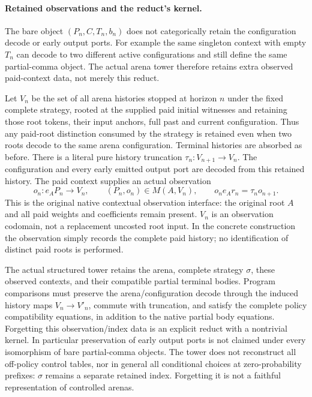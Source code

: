 \documentclass{article}
\begin{document}
\paragraph{Retained observations and the reduct's kernel.}
The bare object $(P_n,C,T_n,b_n)$ does not categorically retain the
configuration decode or early output ports. For example the same singleton
context with empty $T_n$ can decode to two different active configurations
and still define the same partial-comma object. The actual arena tower
therefore retains extra observed paid-context data, not merely this reduct.

Let $V_n$ be the set of all arena histories stopped at horizon $n$ under the
fixed complete strategy, rooted at the supplied paid initial witnesses and
retaining those root tokens, their input anchors, full past and current
configuration. Thus any paid-root distinction consumed by the strategy is
retained even when two roots decode to the same arena configuration. Terminal histories
are absorbed as before. There is a literal pure history truncation
$\tau_n:V_{n+1}\to V_n$. The configuration and every early emitted output
port are decoded from this retained history. The paid context supplies an
actual observation
\[
 o_n:e_AP_n\longrightarrow V_n,
 \qquad (P_n,o_n)\in M(A,V_n),
 \qquad o_n e_Ar_n=\tau_n o_{n+1}.
\]
This is the original native contextual observation interface: the original
root $A$ and all paid weights and coefficients remain present. $V_n$ is an
observation codomain, not a replacement uncosted root input. In the concrete
construction the observation simply records the complete paid history; no
identification of distinct paid roots is performed.

The actual structured tower retains the arena, complete strategy $\sigma$,
these observed contexts, and their compatible partial terminal bodies.
Program comparisons must preserve the arena/configuration decode through the
induced history maps $V_n\to V'_n$, commute with truncation, and satisfy the
complete policy compatibility equations, in addition to the native partial
body equations. Forgetting this observation/index data is an explicit reduct
with a nontrivial kernel. In particular preservation of early output ports is
not claimed under every isomorphism of bare partial-comma objects.
The tower does not reconstruct all off-policy control tables, nor in general
all conditional choices at zero-probability prefixes: $\sigma$ remains a
separate retained index. Forgetting it is not a faithful representation of
controlled arenas.
\end{document}
